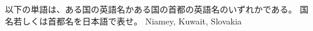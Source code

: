 \documentclass{jarticle}
\begin{document}
\vspace*{\fill}
\begin{center}
以下の単語は、ある国の英語名かある国の首都の英語名のいずれかである。
国名若しくは首都名を日本語で表せ。
Niamey, Kuwait, Slovakia
\end{center}
\vspace*{\fill}
\end{document}

